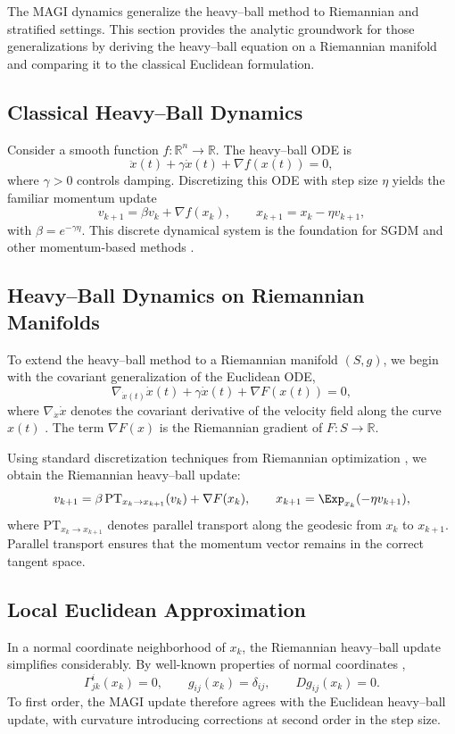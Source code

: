 \documentclass[12pt]{article}
\begin{document}
The MAGI dynamics generalize the heavy–ball method to Riemannian and stratified settings. This section provides the analytic groundwork for those generalizations by deriving the heavy–ball equation on a Riemannian manifold and comparing it to the classical Euclidean formulation.

\subsection*{Classical Heavy–Ball Dynamics}

Consider a smooth function $f : \mathbb{R}^n \to \mathbb{R}$. The heavy–ball ODE is
\[
\ddot{x}(t) + \gamma \dot{x}(t) + \nabla f(x(t)) = 0,
\]
where $\gamma > 0$ controls damping. Discretizing this ODE with step size $\eta$ yields the familiar momentum update
\[
v_{k+1} = \beta v_k + \nabla f(x_k),
\qquad
x_{k+1} = x_k - \eta v_{k+1},
\]
with $\beta = e^{-\gamma \eta}$. This discrete dynamical system is the foundation for SGDM and other momentum-based methods \citep{Rumelhart1986,Sutskever2013}.

\subsection*{Heavy–Ball Dynamics on Riemannian Manifolds}

To extend the heavy–ball method to a Riemannian manifold $(S,g)$, we begin with the covariant generalization of the Euclidean ODE,
\[
\nabla_{\dot{x}(t)} \dot{x}(t) + \gamma \dot{x}(t) + \nabla F(x(t)) = 0,
\]
where $\nabla_{\dot{x}} \dot{x}$ denotes the covariant derivative of the velocity field along the curve $x(t)$ \citep{LeeRiemannian2018,Jost2011}. The term $\nabla F(x)$ is the Riemannian gradient of $F : S \to \mathbb{R}$.

Using standard discretization techniques from Riemannian optimization \citep{Absil2008,Boumal2023}, we obtain the Riemannian heavy–ball update:
\[
v_{k+1} = \beta \,\mathrm{PT}_{x_k \to x_{k+1}}(v_k) + \nabla F(x_k),
\qquad
x_{k+1} = \Exp_{x_k}(-\eta v_{k+1}),
\]
where $\mathrm{PT}_{x_k \to x_{k+1}}$ denotes parallel transport along the geodesic from $x_k$ to $x_{k+1}$. Parallel transport ensures that the momentum vector remains in the correct tangent space.

\subsection*{Local Euclidean Approximation}

In a normal coordinate neighborhood of $x_k$, the Riemannian heavy–ball update simplifies considerably. By well-known properties of normal coordinates \citep{CheegerEbin1975,Sakai1996},
\[
\Gamma^i_{jk}(x_k)=0,
\qquad
g_{ij}(x_k)=\delta_{ij},
\qquad
D g_{ij}(x_k)=0.
\]
To first order, the MAGI update therefore agrees with the Euclidean heavy–ball update, with curvature introducing corrections at second order in the step size.
\end{document}
